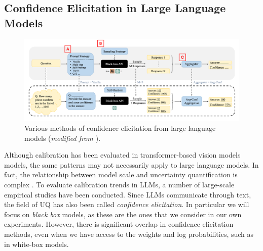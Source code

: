 \subsection{Confidence Elicitation in Large Language Models} \label{subchapter:conf-elicitation}

\begin{figure}[htbp]
	\centering
	\includegraphics[width=1\linewidth] {figures/conf_elicit_llms.png}
	\caption{Various methods of confidence elicitation from large language models (\emph{modified from \citet{xiongCanLLMsExpress2023}}).} \label{fig:conf-elicit-llms}
\end{figure}


Although calibration has been evaluated in transformer-based vision models models, the same patterns may not necessarily apply to large language models. In fact, the relationship between model scale and uncertainty quantification is complex \citep{ye2024llm_uq}. To evaluate calibration trends in LLMs, a number of large-scale empirical studies have been conducted. Since LLMs communicate through text, the field of UQ has also been called \emph{confidence elicitation}. In particular we will focus on \emph{black box} models, as these are the ones that we consider in our own experiments. However, there is significant overlap in confidence elicitation methods, even when we have access to the weights and log probabilities, such as in white-box models. 


